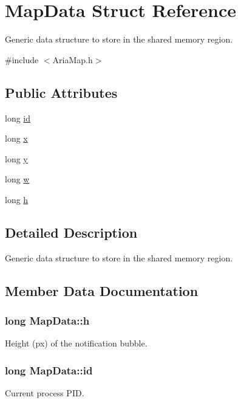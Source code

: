 \hypertarget{structMapData}{}\section{Map\+Data Struct Reference}
\label{structMapData}


Generic data structure to store in the shared memory region.  




{\ttfamily \#include $<$Aria\+Map.\+h$>$}

\subsection*{Public Attributes}
\begin{DoxyCompactItemize}
\item 
long \hyperlink{structMapData_ad27eaf83bb30b0b46e224d5cd78b34b7}{id}
\item 
long \hyperlink{structMapData_a52a37fc0f0cb1564824d68a86d0d4c97}{x}
\item 
long \hyperlink{structMapData_ace819161d4cd3db76cac2f104a9fb78d}{y}
\item 
long \hyperlink{structMapData_a7cc187013c2f397ddbb575ac065fe25e}{w}
\item 
long \hyperlink{structMapData_a31903efa4d79958802ee06a0f268b24a}{h}
\end{DoxyCompactItemize}


\subsection{Detailed Description}
Generic data structure to store in the shared memory region. 

\subsection{Member Data Documentation}
\hypertarget{structMapData_a31903efa4d79958802ee06a0f268b24a}{}
\subsubsection[{h}]{\setlength{\rightskip}{0pt plus 5cm}long Map\+Data\+::h}\label{structMapData_a31903efa4d79958802ee06a0f268b24a}
Height (px) of the notification bubble. \hypertarget{structMapData_ad27eaf83bb30b0b46e224d5cd78b34b7}{}
\subsubsection[{id}]{\setlength{\rightskip}{0pt plus 5cm}long Map\+Data\+::id}\label{structMapData_ad27eaf83bb30b0b46e224d5cd78b34b7}
Current process P\+I\+D. \hypertarget{structMapData_a7cc187013c2f397ddbb575ac065fe25e}{}
